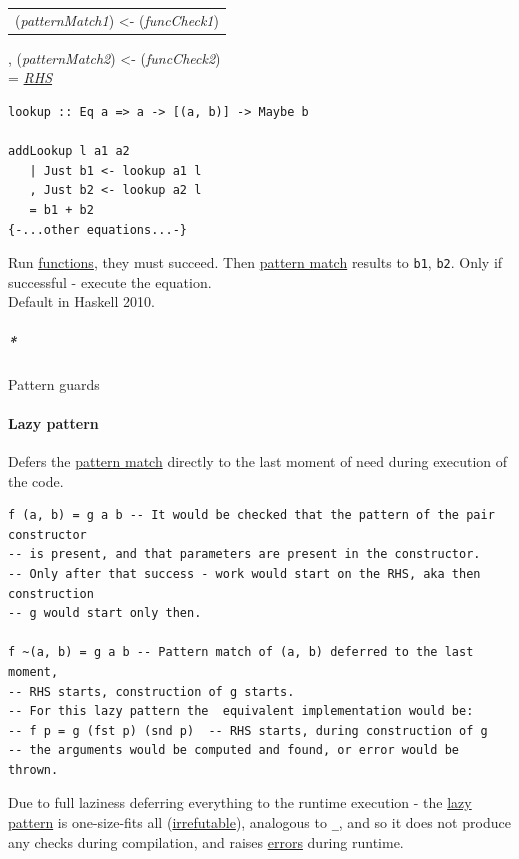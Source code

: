 \documentclass[11pt]{article}
\begin{document}
\begin{center}
\begin{tabular}{l}
(\emph{patternMatch1}) <- (\emph{funcCheck1})\\
\end{tabular}
\end{center}
, (\emph{patternMatch2}) <- (\emph{funcCheck2})\\
= \emph{\hyperref[orgb8773a8]{RHS}}\\

\begin{verbatim}
lookup :: Eq a => a -> [(a, b)] -> Maybe b

addLookup l a1 a2
   | Just b1 <- lookup a1 l
   , Just b2 <- lookup a2 l
   = b1 + b2
{-...other equations...-}
\end{verbatim}
Run \hyperref[org66c5288]{functions}, they must succeed. Then \hyperref[org6cd4afa]{pattern match} results to \texttt{b1}, \texttt{b2}. Only if successful - execute the equation.\\

Default in Haskell 2010.\\

\subparagraph{\emph{*}}
\label{sec:orgf5f046d}

\label{org3d3dda8}Pattern guards\\

\paragraph{\label{org263341c}Lazy pattern}
\label{sec:org0c3c92a}
Defers the \hyperref[org6cd4afa]{pattern match} directly to the last moment of need during execution of the code.\\

\begin{verbatim}
f (a, b) = g a b -- It would be checked that the pattern of the pair constructor
-- is present, and that parameters are present in the constructor.
-- Only after that success - work would start on the RHS, aka then construction
-- g would start only then.

f ~(a, b) = g a b -- Pattern match of (a, b) deferred to the last moment,
-- RHS starts, construction of g starts.
-- For this lazy pattern the  equivalent implementation would be:
-- f p = g (fst p) (snd p)  -- RHS starts, during construction of g
-- the arguments would be computed and found, or error would be thrown.
\end{verbatim}

Due to full laziness deferring everything to the runtime execution - the \hyperref[org263341c]{lazy pattern} is one-size-fits all (\hyperref[org5da5409]{irrefutable}), analogous to \texttt{\_}, and so it does not produce any checks during compilation, and raises \hyperref[orgaf8d923]{errors} during runtime.\\
\end{document}
